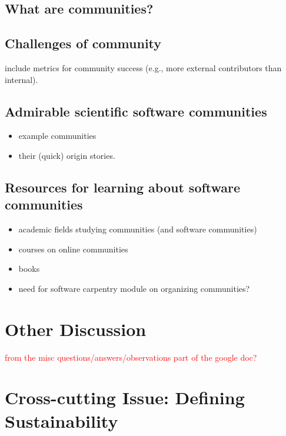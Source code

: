 \documentclass[11pt, oneside]{amsart}
\newcommand{\note}[1]{ {\textcolor{red}    { #1 }}}
\begin{document}
\subsection{What are communities?}
\subsection{Challenges of community}
include metrics for community success (e.g., more external
contributors than internal).
\subsection{Admirable scientific software communities}
\begin{itemize}
\item example communities
\item their (quick) origin stories.
\end{itemize}
\subsection{Resources for learning about software communities}
\begin{itemize}
\item academic fields studying communities (and software communities)
\item courses on online communities
\item books
\item need for software carpentry module on organizing communities?
\end{itemize}

\section{Other Discussion} \label{sec:other}

\note{from the misc questions/answers/observations part of the google doc?}

\section{Cross-cutting Issue: Defining Sustainability}  \label{sec:cross-cutting}
\end{document}
